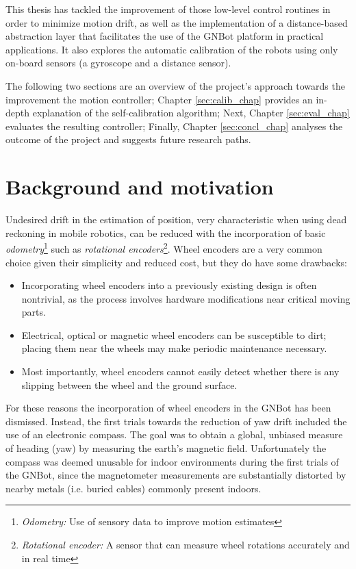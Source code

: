 \documentclass[12pt,twoside]{report}
\begin{document}
\pagebreak



This thesis has tackled the improvement of those low-level control routines in order to minimize motion drift, as well as the implementation of a distance-based abstraction layer that facilitates the use of the GNBot platform in practical applications.
It also explores the automatic calibration of the robots using only on-board sensors (a gyroscope and a distance sensor).

The following two sections are an overview of the project's approach towards the improvement the motion controller; Chapter \ref{sec:calib_chap} provides an in-depth explanation of the self-calibration algorithm; Next, Chapter \ref{sec:eval_chap} evaluates the resulting controller; Finally, Chapter \ref{sec:concl_chap} analyses the outcome of the project and suggests future research paths.



\section{Background and motivation} \label{sec:bg_section}

Undesired drift in the estimation of position, very characteristic when using dead reckoning in mobile robotics, can be reduced with the incorporation of basic \emph{odometry}\footnote{\emph{Odometry:} Use of sensory data to improve motion estimates} such as \emph{rotational encoders}\footnote{\emph{Rotational encoder:} A sensor that can measure wheel rotations accurately and in real time}.
Wheel encoders are a very common choice given their simplicity and reduced cost, but they do have some drawbacks:
\begin{itemize}[noitemsep,topsep=0pt,parsep=5pt,partopsep=0pt]
\item Incorporating wheel encoders into a previously existing design is often nontrivial, as the process involves hardware modifications  near critical moving parts.
\item Electrical, optical or magnetic wheel encoders can be susceptible to dirt; placing them near the wheels may make periodic maintenance necessary.
\item Most importantly, wheel encoders cannot easily detect whether there is any slipping between the wheel and the ground surface.
\end{itemize}

For these reasons the incorporation of wheel encoders in the GNBot has been dismissed.
Instead, the first trials towards the reduction of yaw drift included the use of an electronic compass. The goal was to obtain a global, unbiased measure of heading (yaw) by measuring the earth's magnetic field. Unfortunately the compass was deemed unusable for indoor environments during the first trials of the GNBot\cite{GarciaSaura14}, since the magnetometer measurements are substantially distorted by nearby metals (i.e. buried cables) commonly present indoors.
\end{document}
